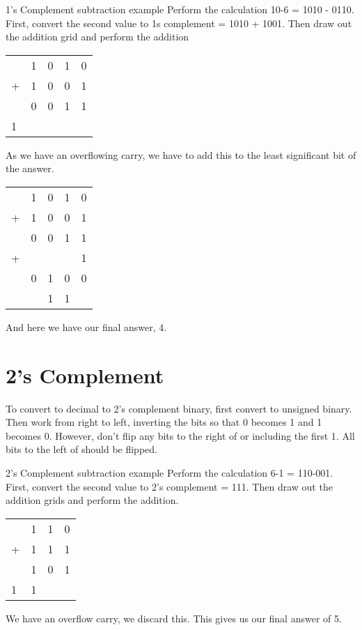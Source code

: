 \begin{example}{1's Complement subtraction example}
Perform the calculation 10-6 = 1010 - 0110.\\
First, convert the second value to 1s complement = 1010 + 1001. Then draw out the addition grid and perform the addition

\begin{table}[H]
    \begin{tabularx}{0.3\textwidth}{XXXXX}
        & 1 & 0 & 1 & 0\\
        + & 1 & 0 & 0 & 1\\
        \hline
        & 0 & 0 & 1 & 1\\
        \hline
        1 &  &  &  & 
    \end{tabularx}
\end{table}
As we have an overflowing carry, we have to add this to the least significant bit of the answer.
\begin{table}[H]
    \begin{tabularx}{0.3\textwidth}{XXXXX}
        & 1 & 0 & 1 & 0\\
        + & 1 & 0 & 0 & 1\\
        \hline
        & 0 & 0 & 1 & 1\\
        + & & & & 1\\
        \hline
        & 0 & 1 & 0 & 0\\
        \hline
        & & 1 & 1 & 
    \end{tabularx}
\end{table}
And here we have our final answer, 4.
\end{example}

\section*{2's Complement}
To convert to decimal to 2's complement binary, first convert to unsigned binary. Then work from right to left, inverting the bits so that 0 becomes 1 and 1 becomes 0. However, don't flip any bits to the right of or including the first 1. All bits to the left of should be flipped.

\begin{example}{2's Complement subtraction example}
Perform the calculation 6-1 = 110-001.\\
First, convert the second value to 2's complement = 111. Then draw out the addition grids and perform the addition.
\begin{table}[H]
    \begin{tabularx}{0.3\textwidth}{XXXX}
        & 1 & 1 & 0\\
        + & 1 & 1 & 1\\
        \hline
        & 1 & 0 & 1\\
        \hline
        1 & 1 & 
    \end{tabularx}
\end{table}
We have an overflow carry, we discard this. This gives us our final answer of 5.
\end{example}